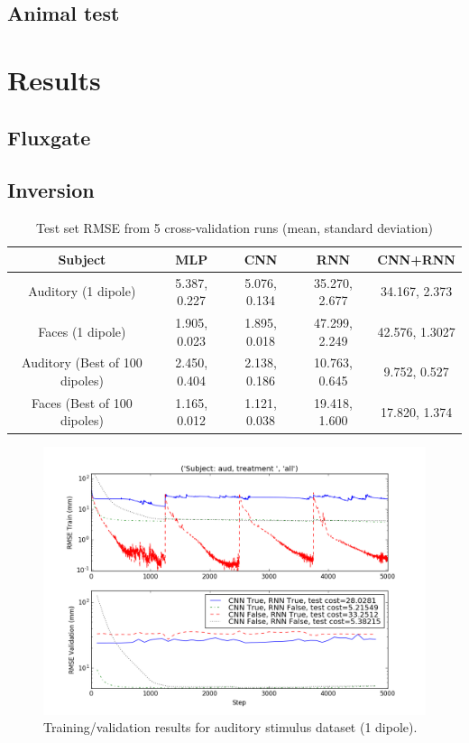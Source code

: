 \documentclass[journal,12pt,onecolumn,draftclsnofoot]{IEEEtran}
\begin{document}
\subsection{Animal test}

\section{Results}

\subsection{Fluxgate}

\subsection{Inversion}
\begin{table}[h!]
  \centering
  \begin{tabular}{c||c|c|c|c}
    \hline
    Subject & MLP & CNN & RNN & CNN+RNN\\
    \hline
    \hline
    Auditory (1 dipole) & 5.387, 0.227 & 5.076, 0.134 & 35.270, 2.677 & 34.167, 2.373 \\
    \hline
    Faces (1 dipole) &  1.905, 0.023 & 1.895, 0.018 & 47.299, 2.249 & 42.576, 1.3027 \\
    \hline
    Auditory (Best of 100 dipoles) & 2.450, 0.404 & 2.138, 0.186 & 10.763, 0.645 & 9.752, 0.527 \\
    \hline
    Faces (Best of 100 dipoles) &  1.165, 0.012 & 1.121, 0.038 & 19.418, 1.600 & 17.820, 1.374 \\
    \hline
  \end{tabular}
  \caption{Test set RMSE from 5 cross-validation runs (mean, standard deviation)}
  \label{tab:results}
\end{table}

\begin{figure}[h!]
\centering
\includegraphics[width=5in]{finalplots/aud1}
\caption{Training/validation results for auditory stimulus dataset (1 dipole).}
\label{fig:aud}
\end{figure}
\end{document}
